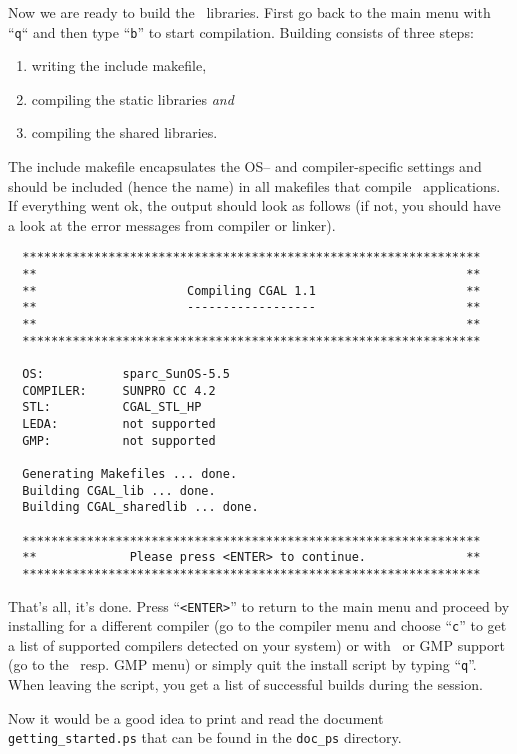 Now we are ready to build the \cgal\ libraries.  First go back to the
main menu with ``\texttt{q}`` and then type ``{\tt b}'' to start
compilation. Building consists of three steps:
\begin{enumerate}
\item writing the include makefile,
\item compiling the static libraries \textit{and}
\item compiling the shared libraries.
\end{enumerate}
The include makefile encapsulates the OS-- and compiler-specific
settings and should be included (hence the name) in all makefiles that
compile \cgal\ applications. If everything went ok, the output should
look as follows (if not, you should have a look at the error messages
from compiler or linker).

{\scriptsize
\begin{verbatim}
  ****************************************************************
  **                                                            **
  **                     Compiling CGAL 1.1                     **
  **                     ------------------                     **
  **                                                            **
  ****************************************************************

  OS:           sparc_SunOS-5.5
  COMPILER:     SUNPRO CC 4.2
  STL:          CGAL_STL_HP
  LEDA:         not supported
  GMP:          not supported

  Generating Makefiles ... done.
  Building CGAL_lib ... done.
  Building CGAL_sharedlib ... done.

  ****************************************************************
  **             Please press <ENTER> to continue.              **
  ****************************************************************
\end{verbatim}}

That's all, it's done. Press ``\texttt{<ENTER>}'' to return to the main
menu and proceed by installing for a different compiler (go to the
compiler menu and choose ``\texttt{c}'' to get a list of supported
compilers detected on your system) or with \leda\ or GMP support (go
to the \leda\ resp.  GMP menu) or simply quit the install script by
typing ``\texttt{q}''. When leaving the script, you get a list of
successful builds during the session.

Now it would be a good idea to print and read the document
\texttt{getting\_started.ps} that can be found in the \texttt{doc\_ps}
directory.


